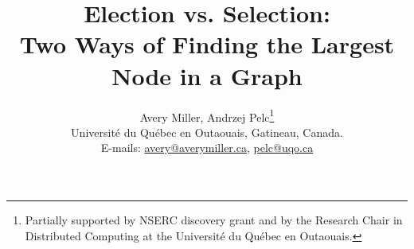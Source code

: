 \documentclass[11pt]{article}
\begin{document}
\baselineskip  0.18in \parskip     0.0in \parindent   0.2in 

\title{{\bf Election vs. Selection:\\ Two Ways of Finding the Largest Node in a Graph}}
\date{}
\newcommand{\inst}[1]{}

\author{
Avery Miller\inst{1},
Andrzej Pelc\inst{1}\footnote{Partially supported by NSERC discovery grant and by the Research Chair in Distributed Computing at the Universit\'e du Qu\'{e}bec en Outaouais.}\\
\inst{1} Universit\'{e} du Qu\'{e}bec en Outaouais, Gatineau, Canada.\\
E-mails: \url{avery@averymiller.ca}, \url{pelc@uqo.ca}\\
}

\date{ }
\maketitle
\end{document}

